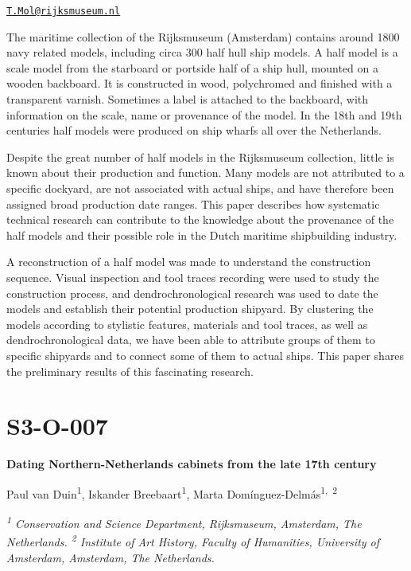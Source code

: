\documentclass[
]{book}
\begin{document}
\href{mailto:T.Mol@rijksmuseum.nl}{\nolinkurl{T.Mol@rijksmuseum.nl}}

The maritime collection of the Rijksmuseum (Amsterdam) contains around 1800 navy related models, including circa 300 half hull ship models. A half model is a scale model from the starboard or portside half of a ship hull, mounted on a wooden backboard. It is constructed in wood, polychromed and finished with a transparent varnish. Sometimes a label is attached to the backboard, with information on the scale, name or provenance of the model. In the 18th and 19th centuries half models were produced on ship wharfs all over the Netherlands.

Despite the great number of half models in the Rijksmuseum collection, little is known about their production and function. Many models are not attributed to a specific dockyard, are not associated with actual ships, and have therefore been assigned broad production date ranges. This paper describes how systematic technical research can contribute to the knowledge about the provenance of the half models and their possible role in the Dutch maritime shipbuilding industry.

A reconstruction of a half model was made to understand the construction sequence. Visual inspection and tool traces recording were used to study the construction process, and dendrochronological research was used to date the models and establish their potential production shipyard. By clustering the models according to stylistic features, materials and tool traces, as well as dendrochronological data, we have been able to attribute groups of them to specific shipyards and to connect some of them to actual ships. This paper shares the preliminary results of this fascinating research.

\hypertarget{s3-o-007}{%
\section*{S3-O-007}\label{s3-o-007}}

\textbf{Dating Northern-Netherlands cabinets from the late 17th century}

Paul van Duin\textsuperscript{1}, Iskander Breebaart\textsuperscript{1}, Marta Domínguez-Delmás\textsuperscript{1,~2}

\emph{\textsuperscript{1} Conservation and Science Department, Rijksmuseum, Amsterdam, The Netherlands. \textsuperscript{2} Institute of Art History, Faculty of Humanities, University of Amsterdam, Amsterdam, The Netherlands.}
\end{document}
